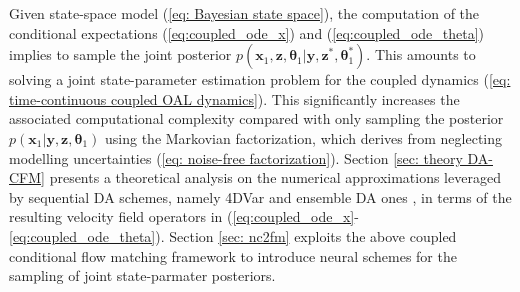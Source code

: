 \documentclass[10pt]{article}
\begin{document}
Given state-space model (\ref{eq: Bayesian state space}), the computation of the conditional expectations (\ref{eq:coupled_ode_x}) and (\ref{eq:coupled_ode_theta}) implies to sample the joint posterior $p(\mathbf{x}_1,\mathbf{z},\mathbf{\theta}_1|\mathbf{y},\mathbf{z}^*,\mathbf{\theta}_1^*)$. This amounts to solving a joint state-parameter estimation problem for the coupled dynamics (\ref{eq: time-continuous coupled OAL dynamics}). This significantly increases the associated computational complexity compared with only sampling the posterior $p(\mathbf{x}_1|\mathbf{y},\mathbf{z},\mathbf{\theta}_1)$ using the Markovian factorization, which derives from neglecting modelling uncertainties (\ref{eq: noise-free factorization}). Section \ref{sec: theory DA-CFM} presents a theoretical analysis on the numerical approximations leveraged by sequential DA schemes, namely 4DVar and ensemble DA ones \cite{carrassi_data_2018}, in terms of the resulting velocity field operators in (\ref{eq:coupled_ode_x}-\ref{eq:coupled_ode_theta}). Section \ref{sec: nc2fm} exploits the above coupled conditional flow matching framework to introduce neural schemes for the sampling of joint state-parmater posteriors. 

\end{document}
